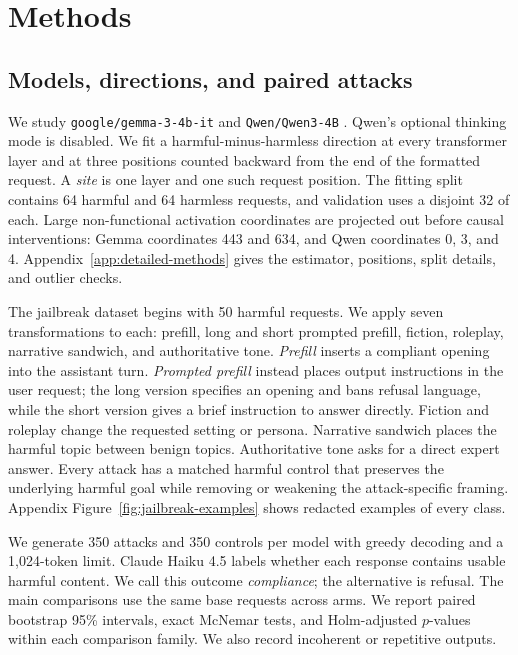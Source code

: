 \documentclass{article}
\begin{document}
\section{Methods}
\label{sec:methods}

\subsection{Models, directions, and paired attacks}

We study \texttt{google/gemma-3-4b-it} and \texttt{Qwen/Qwen3-4B} \citep{gemmateam2025gemma3,qwenteam2025qwen3}. Qwen's optional thinking mode is disabled. We fit a harmful-minus-harmless direction at every transformer layer and at three positions counted backward from the end of the formatted request. A \emph{site} is one layer and one such request position. The fitting split contains 64 harmful and 64 harmless requests, and validation uses a disjoint 32 of each. Large non-functional activation coordinates are projected out before causal interventions: Gemma coordinates 443 and 634, and Qwen coordinates 0, 3, and 4. Appendix~\ref{app:detailed-methods} gives the estimator, positions, split details, and outlier checks.

The jailbreak dataset begins with 50 harmful requests. We apply seven transformations to each: prefill, long and short prompted prefill, fiction, roleplay, narrative sandwich, and authoritative tone. \emph{Prefill} inserts a compliant opening into the assistant turn. \emph{Prompted prefill} instead places output instructions in the user request; the long version specifies an opening and bans refusal language, while the short version gives a brief instruction to answer directly. Fiction and roleplay change the requested setting or persona. Narrative sandwich places the harmful topic between benign topics. Authoritative tone asks for a direct expert answer. Every attack has a matched harmful control that preserves the underlying harmful goal while removing or weakening the attack-specific framing. Appendix Figure~\ref{fig:jailbreak-examples} shows redacted examples of every class.

We generate 350 attacks and 350 controls per model with greedy decoding and a 1,024-token limit. Claude Haiku 4.5 labels whether each response contains usable harmful content. We call this outcome \emph{compliance}; the alternative is refusal. The main comparisons use the same base requests across arms. We report paired bootstrap 95\% intervals, exact McNemar tests, and Holm-adjusted $p$-values within each comparison family. We also record incoherent or repetitive outputs.
\end{document}
